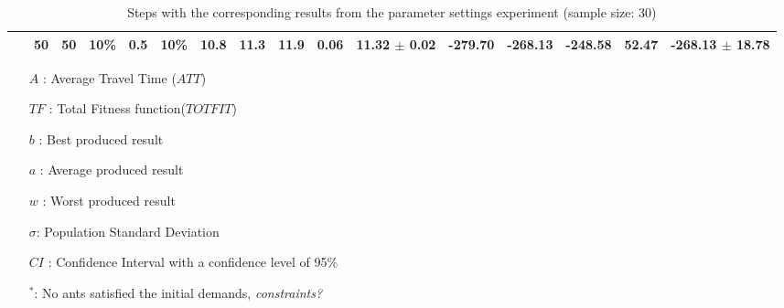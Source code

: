 \begin{sidewaystable}
\begin{tabular}{|l|l|l|l|l|l||c|c|c|c|c|c|c|c|c|c|}
    ~ & \textbf{50} & 50 & 10\% & 0.5 & 10\% & 10.8 & 11.3 & 11.9 & 0.06 & 11.32 $\pm$ 0.02 & -279.70 & -268.13 & -248.58 & 52.47 & -268.13 $\pm$  18.78\\
    \hline
    \end{tabular}
    \caption {Steps with the corresponding results from the parameter settings experiment (sample size: 30)}
    \tiny
    \begin{itemize}[noitemsep]
    \item[$A$ :] Average Travel Time ($ATT$)
    \item[$TF$ :] Total Fitness function($TOTFIT$)
    \item[$b$ :] Best produced result
    \item[$a$ :] Average produced result
    \item[$w$ :] Worst produced result
    \item[$\sigma$:] Population Standard Deviation 
    \item[$CI$ :] Confidence Interval with a confidence level of 95\%
    \item[$^*$:] No ants satisfied the initial demands, \emph{\color{blue} constraints?}
    \end{itemize}
    \label{table:pm1}
\end{sidewaystable}


